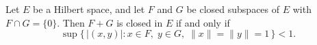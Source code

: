 Let $E$ be a Hilbert space, and let $F$ and $G$ be closed subspaces of $E$ with $F \cap G = \{0\}$. Then $F + G$ is closed in $E$ if and only if
\[
\sup\{\,|(x,y)| : x \in F,\; y \in G,\; \|x\| = \|y\| = 1\,\} < 1.
\]
